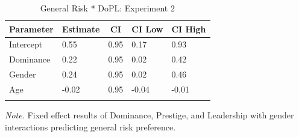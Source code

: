 \documentclass[
  donotrepeattitle,doc, 12pt, a4paper,floatsintext]{apa7}
\begin{document}
\begin{table}[ht]

\begin{center}
\begin{threeparttable}

\caption{\label{tab:PNI-Model-DoPL-Exp-2}General Risk * DoPL: Experiment 2}

\begin{tabular}{lllll}
\toprule
Parameter & \multicolumn{1}{c}{Estimate} & \multicolumn{1}{c}{CI} & \multicolumn{1}{c}{CI Low} & \multicolumn{1}{c}{CI High}\\
\midrule
Intercept & 0.55 & 0.95 & 0.17 & 0.93\\
Dominance & 0.22 & 0.95 & 0.02 & 0.42\\
Gender & 0.24 & 0.95 & 0.02 & 0.46\\
Age & -0.02 & 0.95 & -0.04 & -0.01\\
\bottomrule
\addlinespace
\end{tabular}

\begin{tablenotes}[para]
\normalsize{\textit{Note.} Fixed effect results of Dominance, Prestige, and Leadership with gender interactions predicting general risk preference.}
\end{tablenotes}

\end{threeparttable}
\end{center}

\end{table}
\end{document}
